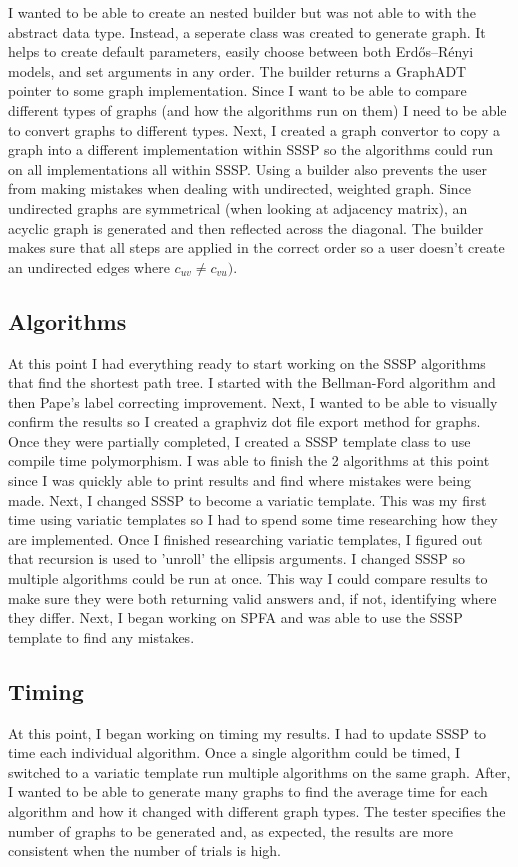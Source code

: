 \documentclass{article}
\begin{document}
I wanted to be able to create an nested builder but was not able to with the abstract data type. Instead, a seperate class was created to generate graph. It helps to create default parameters, easily choose between both Erdős–Rényi models, and set arguments in any order. The builder returns a GraphADT pointer to some graph implementation. Since I want to be able to compare different types of graphs (and how the algorithms run on them) I need to be able to convert graphs to different types. Next, I created a graph convertor to copy a graph into a different implementation within SSSP so the algorithms could run on all implementations all within SSSP. Using a builder also prevents the user from making mistakes when dealing with undirected, weighted graph. Since undirected graphs are symmetrical (when looking at adjacency matrix), an acyclic graph is generated and then reflected across the diagonal. The builder makes sure that all steps are applied in the correct order so a user doesn't create an undirected edges where $c_{uv} \neq c_{vu})$.

\subsection{Algorithms}
At this point I had everything ready to start working on the SSSP algorithms that find the shortest path tree. I started with the Bellman-Ford algorithm and then Pape's label correcting improvement. Next, I wanted to be able to visually confirm the results so I created a graphviz dot file export method for graphs. Once they were partially completed, I created a SSSP template class to use compile time polymorphism. I was able to finish the 2 algorithms at this point since I was quickly able to print results and find where mistakes were being made. Next, I changed SSSP to become a variatic template. This was my first time using variatic templates so I had to spend some time researching how they are implemented. Once I finished researching variatic templates, I figured out that recursion is used to 'unroll' the ellipsis arguments. I changed SSSP so multiple algorithms could be run at once. This way I could compare results to make sure they were both returning valid answers and, if not, identifying where they differ. Next, I began working on SPFA and was able to use the SSSP template to find any mistakes.

\subsection{Timing}
At this point, I began working on timing my results. I had to update SSSP to time each individual algorithm. Once a single algorithm could be timed, I switched to a  variatic template run multiple algorithms on the same graph. After, I wanted to be able to generate many graphs to find the average time for each algorithm and how it changed with different graph types. The tester specifies the number of graphs to be generated and, as expected, the results are more consistent when the number of trials is high.
\end{document}
